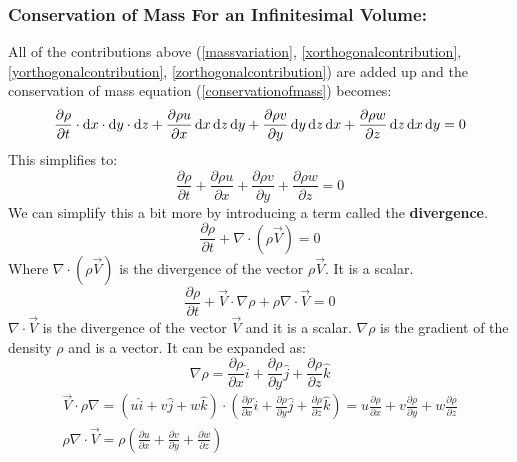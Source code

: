 \subsubsection{Conservation of Mass For an Infinitesimal Volume:}
All of the contributions above (\ref{massvariation}, \ref{xorthogonalcontribution}, \ref{yorthogonalcontribution}, \ref{zorthogonalcontribution}) are added up and the conservation of mass equation (\ref{conservationofmass}) becomes:
\begin{gather}
  \frac{\partial \rho}{\partial t} \cdot\dif x \cdot \dif y \cdot \dif z + \frac{\partial \rho u}{\partial x} \dif x \dif z \dif y + \frac{\partial \rho v}{\partial y} \dif y \dif z \dif x + \frac{\partial \rho w}{\partial z} \dif z \dif x \dif y = 0
\end{gather}
This simplifies to:
\begin{equation}
  \frac{\partial \rho}{\partial t} + \frac{\partial \rho u}{\partial x} + \frac{\partial \rho v}{\partial y} + \frac{\partial \rho w}{\partial z} = 0
\end{equation}
We can simplify this a bit more by introducing a term called the \textbf{divergence}.
\begin{equation}
  \frac{\partial \rho}{\partial t} + \nabla \cdot (\rho \vec{V}) = 0
\end{equation}
Where $\nabla \cdot (\rho \vec{V})$ is the divergence of the vector $\rho \vec{V}$. It is a scalar.
\begin{equation}
  \frac{\partial \rho}{\partial t} + \vec{V}\cdot \nabla \rho + \rho \nabla \cdot \vec{V} = 0
\end{equation}
$\nabla \cdot \vec{V}$ is the divergence of the vector $\vec{V}$ and it is a scalar. $\nabla \rho$ is the gradient of the density $\rho$ and is a vector. It can be expanded as:
\begin{equation}
  \nabla \rho = \frac{\partial \rho}{\partial x} \hat{i} + \frac{\partial \rho}{\partial y} \hat{j} + \frac{\partial \rho}{\partial z} \hat{k}
\end{equation}
\begin{gather}
  \vec{V} \cdot \rho \nabla = (u \hat{i} + v \hat{j} + w \hat{k}) \cdot \left( \frac{\partial \rho}{\partial x} \hat{i} + \frac{\partial \rho}{\partial y} \hat{j} + \frac{\partial \rho}{\partial z} \hat{k} \right) = u \frac{\partial \rho}{\partial x} + v \frac{\partial \rho}{\partial y} + w \frac{\partial \rho}{\partial z}\\
  \rho \nabla \cdot \vec{V} = \rho \left( \frac{\partial u}{\partial x} + \frac{\partial v}{\partial y} + \frac{\partial w}{\partial z} \right)
\end{gather}
